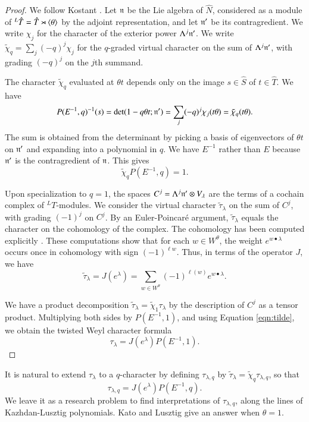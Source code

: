 \begin{proof} 
  We follow Kostant \cite{kostant1961lie}.  Let ${\mathfrak n}$ be the Lie
  algebra of $\hat N$, considered as a module of ${}^L\hat T=\hat
  T\rtimes\langle{\theta}\rangle$ by the adjoint representation, and let ${\mathfrak n}'$
  be its contragredient.  We write $\chi_j$ for the character of the
  exterior power $\Lambda^j {\mathfrak n}'$.  We write $\tilde\chi_q = \sum_j
  (-q)^j\chi_j$ for the $q$-graded virtual character on the sum of
  $\Lambda^j {\mathfrak n}'$, with grading $(-q)^j$ on the $j$th summand.

  The character $\tilde\chi_q$ evaluated at $\theta t$ depends only on
  the image $s\in\hat S$ of $t\in \hat T$.  We have
\[
P(E^{-1},q)^{-1}(s) = \det(1- q\theta t;{\mathfrak n}') 
= \sum_j (-q)^j \chi_j(t\theta) = \tilde\chi_q(t\theta).
\]
The sum is obtained from the determinant by picking a basis of
eigenvectors of $\theta t$ on ${\mathfrak n}'$ and expanding into a polynomial in
$q$.  We have $E^{-1}$ rather than $E$ because ${\mathfrak n}'$ is the
contragredient of ${\mathfrak n}$.  This gives
\begin{equation}\label{eqn:tilde}
\tilde\chi_q P(E^{-1},q) = 1.
\end{equation}

Upon specialization to $q=1$, the spaces $C^j=\Lambda^j {\mathfrak n}'\otimes
V_\lambda$ are the terms of a cochain complex of ${}^LT$-modules.  We
consider the virtual character $\tilde \tau_\lambda$ on the sum of
$C^j$, with grading $(-1)^j$ on $C^j$.  By an Euler-Poincar\'e
argument, $\tilde\tau_\lambda$ equals the character on the cohomology
of the complex.  The cohomology has been computed explicitly
\cite{kostant1961lie}.  These computations show that for each $w\in
W^\theta$, the weight $e^{w\bullet \lambda}$ occurs once in cohomology
with sign $(-1)^{\ell w}$.  Thus, in terms of the operator $J$, we
have
\[
\tilde \tau_\lambda = J(e^\lambda) 
= \sum_{w\in W^\theta} (-1)^{\ell(w)} e^{w\bullet\lambda}.
\]

We have a product decomposition $\tilde \tau_\lambda = \tilde
\chi_{1}\tau_\lambda $ by the description of $C^j$ as a tensor
product.  Multiplying both sides by $P(E^{-1},1)$, and using Equation
\ref{eqn:tilde}, we obtain the twisted Weyl character formula
\begin{equation}
\tau_\lambda = J(e^\lambda) P(E^{-1},1).
\end{equation}
\end{proof}

It is natural to extend $\tau_\lambda$ to a $q$-character by defining
$\tau_{\lambda,q}$ by $\tilde \tau_\lambda = \tilde
\chi_q\tau_{\lambda,q} $, so that
\begin{equation}
\tau_{\lambda,q} = J(e^\lambda) P(E^{-1},q).
\end{equation}
We leave it as a research problem to find interpretations of
$\tau_{\lambda,q}$, along the lines of Kazhdan-Lusztig polynomials.
Kato and Lusztig give an answer when $\theta=1$.


